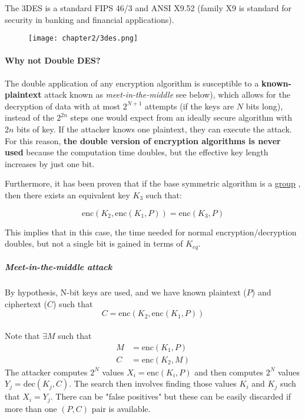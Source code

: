 The 3DES is a standard FIPS 46/3 and ANSI X9.52 (family X9 is standard for security in banking and financial
applications).

\begin{figure}[h]
    \centering
    \texttt{[image: chapter2/3des.png]}
\end{figure}

\paragraph*{Why not Double DES?}
The double application of any encryption algorithm is susceptible to a \textbf{known-plaintext} attack known as \textit{meet-in-the-middle} see below), which allows for the decryption of data with at most \(2^{N+1}\) attempts (if the keys are \(N\) bits long), instead of the $2^{2n}$ steps one would expect from an ideally secure algorithm with $2n$ bits of key.
If the attacker knows one plaintext, they can execute the attack. For this reason, \textbf{the double version of encryption algorithms is never used} because the computation time doubles, but the effective key length increases by just one bit.

Furthermore, it has been proven that if the base symmetric algorithm is a \href{https://en.wikipedia.org/wiki/Group_(mathematics)}{\underline{group}} , then there exists an equivalent key \(K_3\) such that:

\[
    \text{enc}(K_2, \text{enc}(K_1, P)) = \text{enc}(K_3, P)
\]

This implies that in this case, the time needed for normal encryption/decryption doubles, but not a single bit is gained in terms of \(K_{eq}\).

\subparagraph*{Meet-in-the-middle attack}\label{meetinthemiddle}
By hypothesis, N-bit keys are used, and we have known plaintext (\(P\)) and ciphertext (\(C\)) such that
\[C = \text{enc}(K_2, \text{enc}(K_1, P))\] \\
Note that \(\exists M\) such that
\begin{align*}
    M & = \text{enc}(K_1, P) \\
    C & = \text{enc}(K_2, M)
\end{align*}
The attacker computes \(2^N\) values \(X_i = \text{enc}(K_i, P)\) and then computes \(2^N\) values \(Y_j = \text{dec}(K_j, C)\).
The search then involves finding those values \(K_i\) and \(K_j\) such that \(X_i = Y_j\).
There can be "false positives" but these can be easily discarded if more than one \((P, C)\) pair is available.

